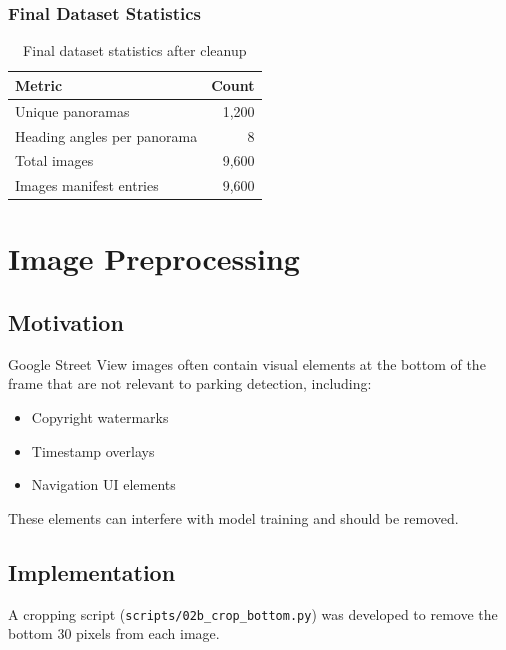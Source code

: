 \documentclass[12pt,a4paper]{article}
\begin{document}
\subsubsection{Final Dataset Statistics}

\begin{table}[H]
	\centering
	\begin{tabular}{lr}
		\toprule
		\textbf{Metric}             & \textbf{Count} \\
		\midrule
		Unique panoramas            & 1,200          \\
		Heading angles per panorama & 8              \\
		Total images                & 9,600          \\
		Images manifest entries     & 9,600          \\
		\bottomrule
	\end{tabular}
	\caption{Final dataset statistics after cleanup}
\end{table}

\section{Image Preprocessing}

\subsection{Motivation}

Google Street View images often contain visual elements at the bottom of the frame that are not relevant to parking detection, including:
\begin{itemize}
	\item Copyright watermarks
	\item Timestamp overlays
	\item Navigation UI elements
\end{itemize}

These elements can interfere with model training and should be removed.

\subsection{Implementation}

A cropping script (\texttt{scripts/02b\_crop\_bottom.py}) was developed to remove the bottom 30 pixels from each image.
\end{document}
